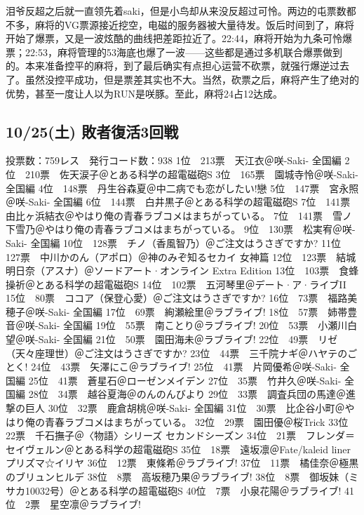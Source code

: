 泪爷反超之后就一直领先着saki，但是小鸟却从来没反超过可怜。两边的屯票数都不多，麻将的VG票源接近挖空，电磁的服务器被大量待发。饭后时间到了，麻将开始了爆票，又是一波炫酷的曲线把差距拉近了。22:44，麻将开始为九条可怜爆票；22:53，麻将管理的53海底也爆了一波——这些都是通过多机联合爆票做到的。本来准备控平的麻将，到了最后确实有点担心运营不砍票，就强行爆逆过去了。虽然没控平成功，但是票差其实也不大。当然，砍票之后，麻将产生了绝对的优势，甚至一度让人以为RUN是咲豚。至此，麻将24占12达成。

\subsection{10/25(土) 敗者復活3回戦}

    投票数：759レス　発行コード数：938
    1位　213票　天江衣＠咲-Saki- 全国編
    2位　210票　佐天涙子＠とある科学の超電磁砲S
    3位　165票　園城寺怜＠咲-Saki- 全国編
    4位　148票　丹生谷森夏＠中二病でも恋がしたい!戀
    5位　147票　宮永照＠咲-Saki- 全国編
    6位　144票　白井黒子＠とある科学の超電磁砲S
    7位　141票　由比ヶ浜結衣＠やはり俺の青春ラブコメはまちがっている。
    7位　141票　雪ノ下雪乃＠やはり俺の青春ラブコメはまちがっている。
    9位　130票　松実宥＠咲-Saki- 全国編
    10位　128票　チノ（香風智乃）＠ご注文はうさぎですか?
    11位　127票　中川かのん（アポロ）＠神のみぞ知るセカイ 女神篇
    12位　123票　結城明日奈（アスナ）＠ソードアート·オンライン Extra Edition
    13位　103票　食蜂操祈＠とある科学の超電磁砲S
    14位　102票　五河琴里＠デート·ア·ライブII
    15位　80票　ココア（保登心愛）＠ご注文はうさぎですか?
    16位　73票　福路美穂子＠咲-Saki- 全国編
    17位　69票　絢瀬絵里＠ラブライブ!
    18位　57票　姉帯豊音＠咲-Saki- 全国編
    19位　55票　南ことり＠ラブライブ!
    20位　53票　小瀬川白望＠咲-Saki- 全国編
    21位　50票　園田海未＠ラブライブ!
    22位　49票　リゼ（天々座理世）＠ご注文はうさぎですか?
    23位　44票　三千院ナギ＠ハヤテのごとく!
    24位　43票　矢澤にこ＠ラブライブ!
    25位　41票　片岡優希＠咲-Saki- 全国編
    25位　41票　蒼星石＠ローゼンメイデン
    27位　35票　竹井久＠咲-Saki- 全国編
    28位　34票　越谷夏海＠のんのんびより
    29位　33票　調査兵団の馬達＠進撃の巨人
    30位　32票　鹿倉胡桃＠咲-Saki- 全国編
    31位　30票　比企谷小町＠やはり俺の青春ラブコメはまちがっている。
    32位　29票　園田優＠桜Trick
    33位　22票　千石撫子＠〈物語〉シリーズ セカンドシーズン
    34位　21票　フレンダ＝セイヴェルン＠とある科学の超電磁砲S
    35位　18票　遠坂凛＠Fate/kaleid liner プリズマ☆イリヤ
    36位　12票　東條希＠ラブライブ!
    37位　11票　橘佳奈＠極黒のブリュンヒルデ
    38位　8票　高坂穂乃果＠ラブライブ!
    38位　8票　御坂妹（ミサカ10032号）＠とある科学の超電磁砲S
    40位　7票　小泉花陽＠ラブライブ!
    41位　2票　星空凛＠ラブライブ!

